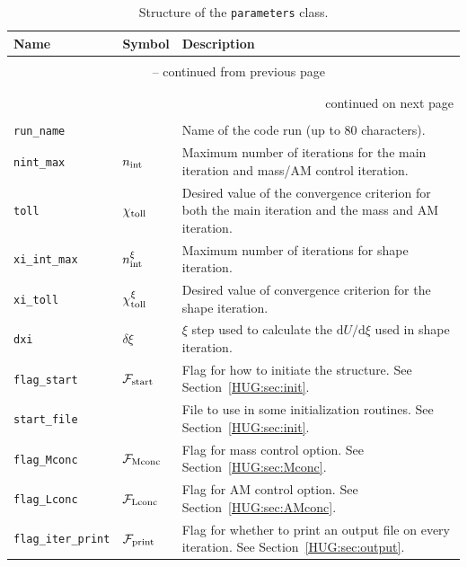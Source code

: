 \documentclass[11pt, oneside]{article}   	%
\begin{document}
\clearpage
\begin{longtable}{l l p{10cm}}
\caption{Structure of the \texttt{parameters} class.}
\label{HUG:tab:parameters_class} \\

Name & Symbol & Description \\ \hline \hline
\multicolumn{3}{l}{} \\
\endfirsthead

\multicolumn{3}{c}{{\tablename\ \thetable{} -- continued from previous page}} \\
\multicolumn{3}{l}{} \\
\endhead

\multicolumn{3}{l}{} \\
\multicolumn{3}{r}{{continued on next page}} \\
\endfoot

\endlastfoot

\multicolumn{3}{l}{Variables} \\
\hline
\texttt{run\_name} & & Name of the code run (up to 80 characters). \\
\texttt{nint\_max} & $n_{\rm int}$ & Maximum number of iterations for the main iteration and mass/AM control iteration. \\
\texttt{toll} & $\chi_{\rm toll}$ & Desired value of the convergence criterion for both the main iteration and the mass and AM iteration. \\
\texttt{xi\_int\_max} & $n_{\rm int}^{\xi}$ & Maximum number of iterations for shape iteration. \\
\texttt{xi\_toll} & $\chi_{\rm toll}^{\xi}$ & Desired value of convergence criterion for the shape iteration. \\
\texttt{dxi} & $\delta \xi$ & $\xi$ step used to calculate the $\mathrm{d}U/\mathrm{d}\xi$ used in shape iteration. \\
\texttt{flag\_start} & $\mathcal{F}_{\rm start}$ & Flag for how to initiate the structure. See Section~\ref{HUG:sec:init}. \\
\texttt{start\_file} & & File to use in some initialization routines. See Section~\ref{HUG:sec:init}. \\
\texttt{flag\_Mconc} & $\mathcal{F}_{\rm Mconc}$ & Flag for mass control option. See Section~\ref{HUG:sec:Mconc}.\\
\texttt{flag\_Lconc} & $\mathcal{F}_{\rm Lconc}$ & Flag for AM control option. See Section~\ref{HUG:sec:AMconc}. \\
\texttt{flag\_iter\_print} & $\mathcal{F}_{\rm print}$ & Flag for whether to print an output file on every iteration. See Section~\ref{HUG:sec:output}. \\


\end{longtable}
\end{document}
